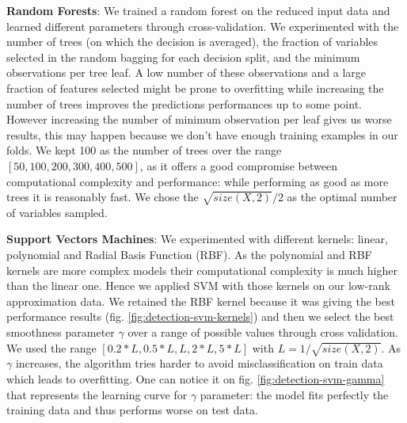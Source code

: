 \documentclass{article}
\begin{document}
    \textbf{Random Forests}: We trained a random forest on the reduced input data and learned different parameters through cross-validation. We experimented with the number of trees (on which the decision is averaged), the fraction of variables selected in the random bagging for each decision split, and the minimum observations per tree leaf. A low number of these observations and a large fraction of features selected might be prone to overfitting while increasing the number of trees improves the predictions performances up to some point. However increasing the number of minimum observation per leaf gives us worse results, this may happen because we don't have enough training examples in our folds. We kept 100 as the number of trees over the range $[50, 100, 200, 300, 400, 500]$, as it offers a good compromise between computational complexity and performance:  while performing as good as more trees it is reasonably fast. We chose the $\sqrt{size(X,2)}/ 2$ as the optimal number of variables sampled.

  \textbf{Support Vectors Machines}: We experimented with different kernels: linear, polynomial and Radial Basis Function (RBF). As the polynomial and RBF kernels are more complex models their computational complexity is much higher than the linear one. Hence we applied SVM with those kernels on our low-rank approximation data. We retained the RBF kernel because it was giving the best performance results (fig. \ref{fig:detection-svm-kernels}) and then we select the best smoothness parameter $\gamma$ over a range of possible values through cross validation. We used the range $[0.2*L, 0.5*L, L, 2*L, 5*L]$ with $L = 1 / \sqrt{size(X,2)}$. As $\gamma$ increases, the algorithm tries harder to avoid misclassification on train data which leads to overfitting. One can notice it on fig. \ref{fig:detection-svm-gamma} that represents the learning curve for $\gamma$ parameter: the model fits perfectly the training data and thus performs worse on test data.
\end{document}
